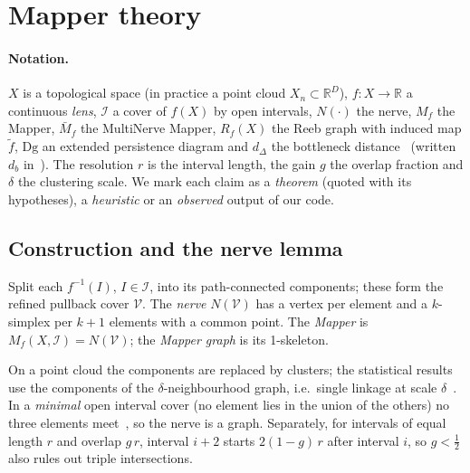 \section{Mapper theory}
\label{sec:mapper}

\paragraph{Notation.}
$X$ is a topological space (in practice a point cloud $X_n\subset\mathbb{R}^D$),
$f\colon X\to\mathbb{R}$ a continuous \emph{lens}, $\mathcal{I}$ a cover of $f(X)$
by open intervals, $N(\cdot)$ the nerve, $M_f$ the Mapper, $\bar M_f$ the
MultiNerve Mapper, $R_f(X)$ the Reeb graph with induced map $\tilde f$,
$\mathrm{Dg}$ an extended persistence diagram and $d_\Delta$ the bottleneck
distance~\cite{carriere2018statistical} (written $d_b$
in~\cite{carriere2018structure}). The resolution $r$ is the interval
length, the gain $g$ the overlap fraction and $\delta$ the clustering
scale. We mark each claim as a \emph{theorem} (quoted with its
hypotheses), a \emph{heuristic} or an \emph{observed} output of our code.

\subsection{Construction and the nerve lemma}

\begin{definition}
Split each $f^{-1}(I)$, $I\in\mathcal{I}$, into its path-connected
components; these form the refined pullback cover $\mathcal{V}$. The
\emph{nerve} $N(\mathcal{V})$ has a vertex per element and a $k$-simplex per
$k+1$ elements with a common point. The \emph{Mapper} is
$M_f(X,\mathcal{I})=N(\mathcal{V})$; the \emph{Mapper graph} is its
1-skeleton.
\end{definition}

On a point cloud the components are replaced by clusters; the statistical
results use the components of the $\delta$-neighbourhood graph, i.e.\
single linkage at scale $\delta$~\cite[Sec.~2.1]{carriere2018statistical}.
In a \emph{minimal} open interval cover (no element lies in the union of
the others) no three elements meet~\cite[Lemma~2.12]{carriere2018structure},
so the nerve is a graph. Separately, for intervals of equal length $r$
and overlap $g\,r$, interval $i+2$ starts $2(1-g)\,r$ after interval $i$,
so $g<\frac12$ also rules out triple intersections.

